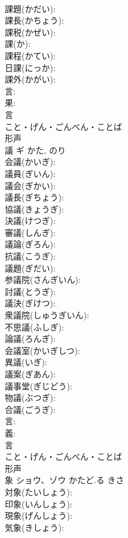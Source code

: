 \documentclass[8pt]{extreport}
\begin{document}
\begin{CJK}{UTF8}{min}
\\	課題(かだい): 
\\	課長(かちょう): 
\\	課税(かぜい): 
\\	課(か): 
\\	課程(かてい): 
\\	日課(にっか): 
\\	課外(かがい): 
\\	言: 
\\	果: 
\\	言	
\\	こと・げん・ごんべん・ことば	
\\	形声 
\\	議	ギ		かた, のり	
\\	会議(かいぎ): 
\\	議員(ぎいん): 
\\	議会(ぎかい): 
\\	議長(ぎちょう): 
\\	協議(きょうぎ): 
\\	決議(けつぎ): 
\\	審議(しんぎ): 
\\	議論(ぎろん): 
\\	抗議(こうぎ): 
\\	議題(ぎだい): 
\\	参議院(さんぎいん): 
\\	討議(とうぎ): 
\\	議決(ぎけつ): 
\\	衆議院(しゅうぎいん): 
\\	不思議(ふしぎ): 
\\	論議(ろんぎ): 
\\	会議室(かいぎしつ): 
\\	異議(いぎ): 
\\	議案(ぎあん): 
\\	議事堂(ぎじどう): 
\\	物議(ぶつぎ): 
\\	合議(ごうぎ): 
\\	言: 
\\	義: 
\\	言	
\\	こと・げん・ごんべん・ことば	
\\	形声 
\\	象	ショウ、ゾウ	かたど.る	きさ	
\\	対象(たいしょう): 
\\	印象(いんしょう): 
\\	現象(げんしょう): 
\\	気象(きしょう): 

\end{CJK}
\end{document}
